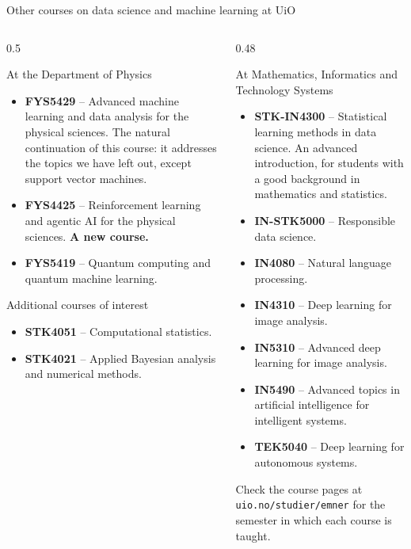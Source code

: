 \documentclass[10pt,aspectratio=169]{beamer}
\begin{document}
\begin{frame}{Other courses on data science and machine learning at UiO}
\begin{columns}[T]
\begin{column}{0.5\textwidth}
\footnotesize
\begin{block}{At the Department of Physics}
\begin{itemize}
  \item \textbf{FYS5429} -- Advanced machine learning and data analysis for
    the physical sciences.  The natural continuation of this course: it
    addresses the topics we have left out, except support vector machines.
  \item \textbf{FYS4425} -- Reinforcement learning and agentic AI for the
    physical sciences.  \textbf{A new course.}
  \item \textbf{FYS5419} -- Quantum computing and quantum machine learning.
\end{itemize}
\end{block}
\begin{block}{Additional courses of interest}
\begin{itemize}
  \item \textbf{STK4051} -- Computational statistics.
  \item \textbf{STK4021} -- Applied Bayesian analysis and numerical methods.
\end{itemize}
\end{block}
\end{column}
\begin{column}{0.48\textwidth}
\footnotesize
\begin{block}{At Mathematics, Informatics and Technology Systems}
\begin{itemize}
  \item \textbf{STK-IN4300} -- Statistical learning methods in data
    science.  An advanced introduction, for students with a good background
    in mathematics and statistics.
  \item \textbf{IN-STK5000} -- Responsible data science.
  \item \textbf{IN4080} -- Natural language processing.
  \item \textbf{IN4310} -- Deep learning for image analysis.
  \item \textbf{IN5310} -- Advanced deep learning for image analysis.
  \item \textbf{IN5490} -- Advanced topics in artificial intelligence for
    intelligent systems.
  \item \textbf{TEK5040} -- Deep learning for autonomous systems.
\end{itemize}
\end{block}
Check the course pages at \texttt{uio.no/studier/emner} for the semester in
which each course is taught.
\end{column}
\end{columns}
\end{frame}
\end{document}
